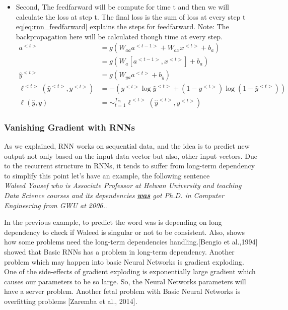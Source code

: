 \begin{itemize}
\item Second, The feedfarward will be compute for time t and then we will calculate the loss at step t. The final loss is the sum of loss at every step t eq\eqref{eq:rnn_feedfarward} explains the steps for feedfarward. Note: The backpropagation here will be calculated though time at every step.
  \begin{subequations}\label{eq:rnn_feedfarward}
\begin{align}
  a^{<t>} & = g(W_{aa}a^{<t-1>}+ W_{ax}x^{<t>}+b_a)\\
   & = g(W_a[a^{<t-1>},x^{<t>}]+ b_a)\\
  \widehat{y}^{<t>} & = g(W_{ya}a^{<t>}+ b_y)
  \\ \ell^{<t>}(\widehat{y}^{<t>},y^{<t>}) & = - (y^{<t>} \log \widehat{y}^{<t>} + (1-y^{<t>}) \log (1-\widehat{y}^{<t>}))
\\ \ell(\widehat{y},y) & = \sim_{t=1}^{T_m} \ell^{<t>}(\widehat{y}^{<t>},y^{<t>})                                              
\end{align}
\end{subequations}

  
 \end{itemize}

\newpage
 \subsubsection{Vanishing Gradient with RNNs}
 
 As we explained, RNN works on sequential data, and the idea is to predict new output not only based on the input data vector but also, other input vectors. Due to the recurrent structure in RNNs, it tends to suffer from long-term dependency to simplify this point let’s have an example, the following sentence \\
 \textit{Waleed Yousef who is Associate Professor at Helwan University and teaching Data Science courses and its dependencies \textbf{\underline{was}} got Ph.D. in Computer Engineering from GWU at 2006.}.

 In the previous example, to predict the word was is depending on long dependency to check if Waleed is singular or not to be consistent. Also, shows how some problems need the long-term dependencies handling.[Bengio et al.,1994]\cite{Bengio_ et_ al} showed that Basic RNNs has a problem in long-term dependency.  Another problem which may happen into basic Neural Networks is gradient exploding. One of the side-effects of gradient exploding is exponentially large gradient which causes our parameters to be so large. So, the Neural Networks parameters will have a server problem. Another fetal problem with Basic Neural Networks is overfitting problems [Zaremba et al., 2014]\cite{Zaremba_et_al}.
 
